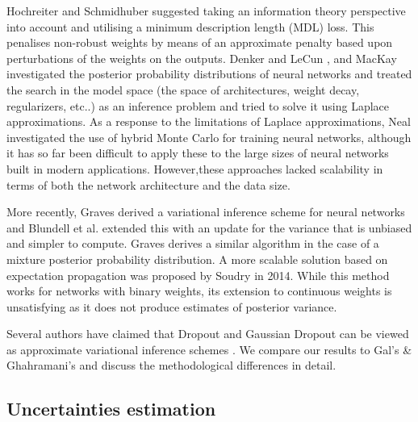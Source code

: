 Hochreiter and Schmidhuber \cite{hochreiter1995simplifying} suggested taking an information theory perspective into account and utilising a minimum description length (MDL) loss. This penalises non-robust weights by means of an approximate penalty based upon perturbations of the weights on the outputs.
Denker and LeCun \cite{denker1991transforming}, and MacKay \cite{mackay1995probable} investigated the posterior probability distributions of neural networks and treated the search in the model space (the space of architectures, weight decay, regularizers, etc..) as an inference problem and tried to solve it using Laplace approximations.
As a response to the limitations of Laplace approximations, Neal \cite{neal2012bayesian} investigated the use of hybrid Monte Carlo for training neural networks, although it has so far been difficult to apply these to the large sizes of neural networks built in modern applications. 
However,these approaches lacked scalability in terms of both the network architecture and the data size. 


More recently, Graves \cite{graves2011practical} derived a variational inference scheme for neural networks and Blundell et al. \cite{blundell2015weight} extended this with an update for the variance that is unbiased and simpler to compute. Graves \cite{graves2016stochastic} derives a similar algorithm in the case of a mixture posterior probability distribution. 
A more scalable solution based on expectation propagation was proposed by Soudry \cite{Soudry:NIPS2014_5269} in 2014. While this method works for networks with binary weights, its extension to continuous weights is unsatisfying as it does not produce estimates of posterior variance.

\newline Several authors have claimed that Dropout \cite{srivastava2014dropout} and Gaussian Dropout \cite{wang2013fast} can be viewed as approximate variational inference schemes \cite{gal2015bayesian, kingma2015variational}. We compare our results to Gal's \& Ghahramani's \cite{gal2015bayesian} and discuss the methodological differences in detail.


\subsection{Uncertainties estimation}

